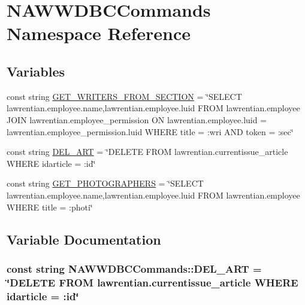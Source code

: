\hypertarget{namespace_n_a_w_w_d_b_c_commands}{}\section{N\+A\+W\+W\+D\+B\+C\+Commands Namespace Reference}
\label{namespace_n_a_w_w_d_b_c_commands}
\subsection*{Variables}
\begin{DoxyCompactItemize}
\item 
const string \hyperlink{namespace_n_a_w_w_d_b_c_commands_abace88a9f6f519876b781aa0ca7bf74f}{G\+E\+T\+\_\+\+W\+R\+I\+T\+E\+R\+S\+\_\+\+F\+R\+O\+M\+\_\+\+S\+E\+C\+T\+I\+O\+N} = \char`\"{}S\+E\+L\+E\+C\+T lawrentian.\+employee.\+name,lawrentian.\+employee.\+luid F\+R\+O\+M lawrentian.\+employee J\+O\+I\+N lawrentian.\+employee\+\_\+permission O\+N lawrentian.\+employee.\+luid = lawrentian.\+employee\+\_\+permission.\+luid W\+H\+E\+R\+E title = \+:wri A\+N\+D token = \+:sec\char`\"{}
\item 
const string \hyperlink{namespace_n_a_w_w_d_b_c_commands_a09c89e2b4537a2ab0ecdcb43561cadfd}{D\+E\+L\+\_\+\+A\+R\+T} = \char`\"{}D\+E\+L\+E\+T\+E F\+R\+O\+M lawrentian.\+currentissue\+\_\+article W\+H\+E\+R\+E idarticle = \+:id\char`\"{}
\item 
const string \hyperlink{namespace_n_a_w_w_d_b_c_commands_a85f29126f3ec88817556a57c801da32c}{G\+E\+T\+\_\+\+P\+H\+O\+T\+O\+G\+R\+A\+P\+H\+E\+R\+S} = \char`\"{}S\+E\+L\+E\+C\+T lawrentian.\+employee.\+name,lawrentian.\+employee.\+luid F\+R\+O\+M lawrentian.\+employee W\+H\+E\+R\+E title = \+:photi\char`\"{}
\end{DoxyCompactItemize}


\subsection{Variable Documentation}
\hypertarget{namespace_n_a_w_w_d_b_c_commands_a09c89e2b4537a2ab0ecdcb43561cadfd}{}
\subsubsection[{D\+E\+L\+\_\+\+A\+R\+T}]{\setlength{\rightskip}{0pt plus 5cm}const string N\+A\+W\+W\+D\+B\+C\+Commands\+::\+D\+E\+L\+\_\+\+A\+R\+T = \char`\"{}D\+E\+L\+E\+T\+E F\+R\+O\+M lawrentian.\+currentissue\+\_\+article W\+H\+E\+R\+E idarticle = \+:id\char`\"{}}\label{namespace_n_a_w_w_d_b_c_commands_a09c89e2b4537a2ab0ecdcb43561cadfd}
\hypertarget{namespace_n_a_w_w_d_b_c_commands_a85f29126f3ec88817556a57c801da32c}{}
